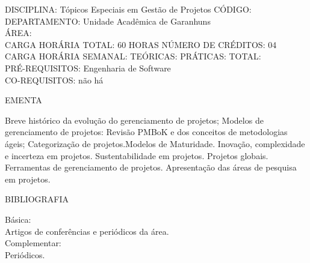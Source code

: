 \documentclass[
	12pt,				%
	openright,			%
  oneside,     %
	a4paper,			%
	english,			%
	french,				%
	spanish,			%
	brazil				%
	]{abntex2}
\begin{document}
\begin{apendicesenv}
DISCIPLINA: Tópicos Especiais em Gestão de Projetos CÓDIGO:\\ 
DEPARTAMENTO: Unidade Acadêmica de Garanhuns\\ ÁREA: \\
CARGA HORÁRIA TOTAL: 60 HORAS NÚMERO DE CRÉDITOS: 04\\
CARGA HORÁRIA SEMANAL: TEÓRICAS: PRÁTICAS: TOTAL: \\
PRÉ-REQUISITOS: Engenharia de Software\\
CO-REQUISITOS: não há

EMENTA 

Breve histórico da evolução do gerenciamento de projetos; Modelos de
gerenciamento de projetos: Revisão PMBoK e dos conceitos de
metodologias ágeis; Categorização de projetos.Modelos de Maturidade.
Inovação, complexidade e incerteza em projetos. Sustentabilidade em
projetos. Projetos globais. Ferramentas de gerenciamento de projetos.
Apresentação das áreas de pesquisa em projetos.

BIBLIOGRAFIA 

Básica:\\
Artigos de conferências e periódicos da área.\\
Complementar:\\
Periódicos.

\end{apendicesenv}











\end{document}
